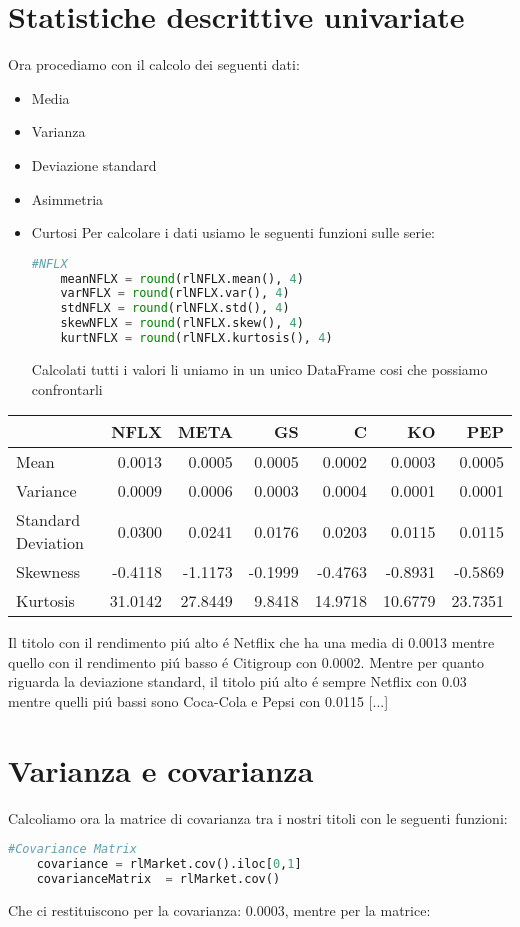 \documentclass{report}
\begin{document}
\section{Statistiche descrittive univariate}
Ora procediamo con il calcolo dei seguenti dati:
\begin{itemize}[leftmargin=30pt, rightmargin=2cm]
\item Media
\item Varianza
\item Deviazione standard
\item Asimmetria
\item Curtosi
Per calcolare i dati usiamo le seguenti funzioni sulle serie:
\begin{lstlisting}[language=python]
    #NFLX
    meanNFLX = round(rlNFLX.mean(), 4)
    varNFLX = round(rlNFLX.var(), 4)
    stdNFLX = round(rlNFLX.std(), 4)
    skewNFLX = round(rlNFLX.skew(), 4)
    kurtNFLX = round(rlNFLX.kurtosis(), 4)
\end{lstlisting}
Calcolati tutti i valori li uniamo in un unico DataFrame cosi che possiamo confrontarli
\end{itemize}
\begin{tabular}{lrrrrrr}
\toprule
{} &     NFLX &     META &      GS &        C &       KO &      PEP \\
\midrule
Mean               &   0.0013 &   0.0005 &  0.0005 &   0.0002 &   0.0003 &   0.0005 \\
Variance           &   0.0009 &   0.0006 &  0.0003 &   0.0004 &   0.0001 &   0.0001 \\
Standard Deviation &   0.0300 &   0.0241 &  0.0176 &   0.0203 &   0.0115 &   0.0115 \\
Skewness           &  -0.4118 &  -1.1173 & -0.1999 &  -0.4763 &  -0.8931 &  -0.5869 \\
Kurtosis           &  31.0142 &  27.8449 &  9.8418 &  14.9718 &  10.6779 &  23.7351 \\
\bottomrule
\end{tabular}

\noindent Il titolo con il rendimento piú alto é Netflix che ha una media di \num{0.0013} mentre quello con il rendimento piú basso é Citigroup con \num{0.0002}.
Mentre per quanto riguarda la deviazione standard, il titolo piú alto é sempre Netflix con \num{0.03} mentre quelli piú bassi sono Coca-Cola e Pepsi con \num{0.0115} [...]
\section{Varianza e covarianza}
Calcoliamo ora la matrice di covarianza tra i nostri titoli con le seguenti funzioni:
\begin{lstlisting}[language=python]
    #Covariance Matrix
    covariance = rlMarket.cov().iloc[0,1]
    covarianceMatrix  = rlMarket.cov()
\end{lstlisting}
Che ci restituiscono per la covarianza: \num{0.0003}, mentre per la matrice:
\end{document}
